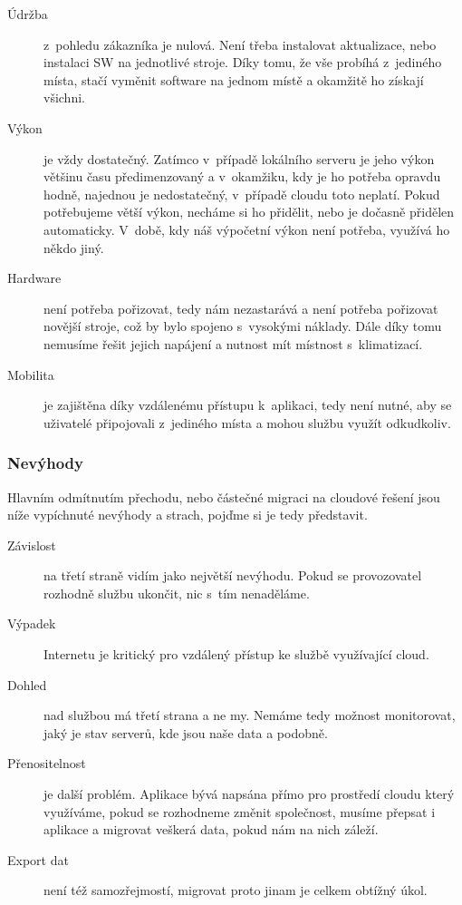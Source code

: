 \begin{description}
  \item [Údržba] z~pohledu zákazníka je nulová. Není třeba instalovat aktualizace, nebo instalaci SW na jednotlivé stroje. Díky tomu, že vše probíhá z~jediného místa, stačí vyměnit software na jednom místě a okamžitě ho získají všichni.
	\item [Výkon] je vždy dostatečný. Zatímco v~případě lokálního serveru je jeho výkon většinu času předimenzovaný a v~okamžiku, kdy je ho potřeba opravdu hodně, najednou je nedostatečný, v~případě cloudu toto neplatí. Pokud potřebujeme větší výkon, necháme si ho přidělit, nebo je dočasně přidělen automaticky. V~době, kdy náš výpočetní výkon není potřeba, využívá ho někdo jiný.
  \item [Hardware] není potřeba pořizovat, tedy nám nezastarává a není potřeba pořizovat novější stroje, což by bylo spojeno s~vysokými náklady. Dále díky tomu nemusíme řešit jejich napájení a nutnost mít místnost s~klimatizací.
  \item [Mobilita] je zajištěna díky vzdálenému přístupu k~aplikaci, tedy není nutné, aby se uživatelé připojovali z~jediného místa a mohou službu využít odkudkoliv.
\end{description}

\subsubsection{Nevýhody}
Hlavním odmítnutím přechodu, nebo částečné migraci na cloudové řešení jsou níže vypíchnuté nevýhody a strach, pojďme si je tedy představit.

\begin{description}
  \item [Závislost] na třetí straně vidím jako největší nevýhodu. Pokud se provozovatel rozhodně službu ukončit, nic s~tím nenaděláme.
  \item [Výpadek] Internetu je kritický pro vzdálený přístup ke službě využívající cloud.
  \item [Dohled] nad službou má třetí strana a ne my. Nemáme tedy možnost monitorovat, jaký je stav serverů, kde jsou naše data a podobně.
  \item [Přenositelnost] je další problém. Aplikace bývá napsána přímo pro prostředí cloudu který využíváme, pokud se rozhodneme změnit společnost, musíme přepsat i aplikace a migrovat veškerá data, pokud nám na nich záleží.
  \item [Export dat] není též samozřejmostí, migrovat proto jinam je celkem obtížný úkol.
\end{description}
\newpage
